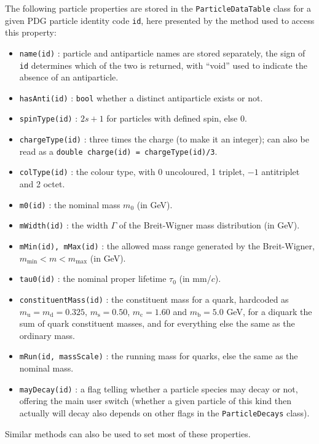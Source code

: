 \documentclass{elsartmod}
\begin{document}
The following particle properties are stored in the 
\texttt{ParticleDataTable} class for a given PDG particle identity code 
\texttt{id}, here presented by the method used to access this property:
\begin{itemize} 
\item \texttt{name(id)} : 
particle and antiparticle names are stored separately,
the sign of \texttt{id} determines which of the two is returned, with
``void'' used to indicate the absence of an antiparticle. 
\item \texttt{hasAnti(id)} : 
\texttt{bool} whether a distinct antiparticle exists or not.
\item \texttt{spinType(id)} : $2 s + 1$ for particles with defined spin,
else 0.
\item \texttt{chargeType(id)} : 
three times the charge (to make it an integer); can also be read as a 
\texttt{double charge(id) = chargeType(id)/3}.
\item \texttt{colType(id)} : 
the colour type, with 0 uncoloured, 1 triplet, $-1$ antitriplet 
and 2 octet.
\item \texttt{m0(id)} : 
the nominal mass $m_0$ (in GeV).
\item \texttt{mWidth(id)} :
the width $\Gamma$ of the Breit-Wigner mass distribution (in GeV).
\item \texttt{mMin(id), mMax(id)} : 
the allowed mass range generated by the Breit-Wigner,
$m_{\mathrm{min}} < m < m_{\mathrm{max}}$ (in GeV).
\item \texttt{tau0(id)} : 
the nominal proper lifetime $\tau_0$ (in mm/$c$). 
\item \texttt{constituentMass(id)} : 
the constituent mass for a quark, hardcoded as 
$m_{\mathrm{u}} = m_{\mathrm{d}} = 0.325$, $m_{\mathrm{s}} = 0.50$, 
$m_{\mathrm{c}} = 1.60$ and $m_{\mathrm{b}} = 5.0$ GeV, for a diquark 
the sum of quark constituent masses, and for everything else the same 
as the ordinary mass.
\item \texttt{mRun(id, massScale)} : the running mass for quarks, 
else the same as the nominal mass.
\item \texttt{mayDecay(id)} : 
a flag telling whether a particle species may decay or not, offering 
the main user switch (whether a given particle of this kind then 
actually will decay also depends on other flags in the 
\texttt{ParticleDecays} class).
\end{itemize}
Similar methods can also be used to set most of these properties.
\end{document}
